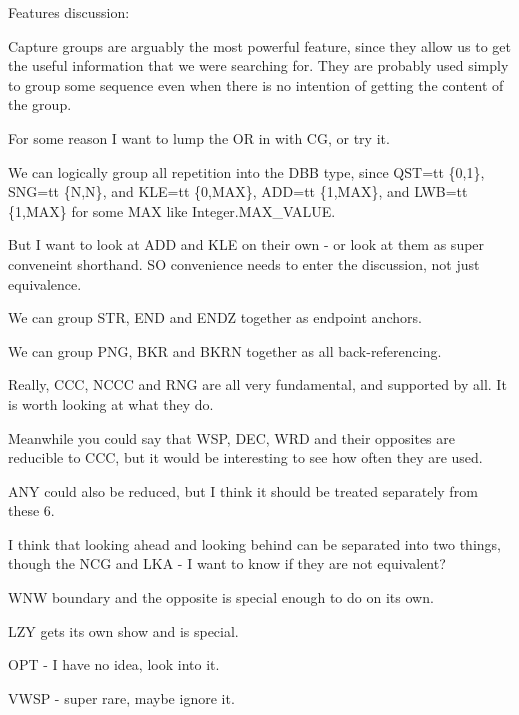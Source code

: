 Features discussion:

Capture groups are arguably the most powerful feature, since they allow us to get the useful information that we were searching for.  They are probably used simply to group some sequence even when there is no intention of getting the content of the group.

For some reason I want to lump the OR in with CG, or try it.

We can logically group all repetition into the DBB type, since QST={tt \{0,1\}}, SNG={tt \{N,N\}}, and KLE={tt \{0,MAX\}}, ADD={tt \{1,MAX\}}, and LWB={tt \{1,MAX\}} for some MAX like Integer.MAX\_VALUE.

But I want to look at ADD and KLE on their own - or look at them as super conveneint shorthand.  SO convenience needs to enter the discussion, not just equivalence.

We can group STR, END and ENDZ together as endpoint anchors.

We can group PNG, BKR and BKRN together as all back-referencing.

Really, CCC, NCCC and RNG are all very fundamental, and supported by all.  It is worth looking at what they do.

Meanwhile you could say that WSP, DEC, WRD and their opposites are reducible to CCC, but it would be interesting to see how often they are used.

ANY could also be reduced, but I think it should be treated separately from these 6.

I think that looking ahead and looking behind can be separated into two things, though the NCG and LKA - I want to know if they are not equivalent?

WNW boundary and the opposite is special enough to do on its own.

LZY gets its own show and is special.

OPT - I have no idea, look into it.

VWSP - super rare, maybe ignore it.








